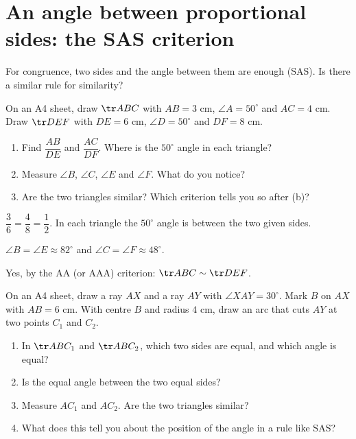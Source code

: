 \section{An angle between proportional sides: the SAS criterion}

For congruence, two sides and the angle between them are enough (SAS). Is there a similar rule for similarity?

\begin{solvefirst}
  \item On an A4 sheet, draw $\tr ABC$ with $AB=3$ cm, $\angle A=50^\circ$ and $AC=4$ cm. Draw $\tr DEF$ with $DE=6$ cm, $\angle D=50^\circ$ and $DF=8$ cm.
  \begin{enumerate}[label=(\alph*),itemsep=1pt]
    \item Find $\dfrac{AB}{DE}$ and $\dfrac{AC}{DF}$. Where is the $50^\circ$ angle in each triangle?
    \item Measure $\angle B$, $\angle C$, $\angle E$ and $\angle F$. What do you notice?
    \item Are the two triangles similar? Which criterion tells you so after (b)?
  \end{enumerate}
\begin{solution}
\begin{steps}
  \item[(a)] $\dfrac36=\dfrac48=\dfrac12$. In each triangle the $50^\circ$ angle is between the two given sides.
  \item[(b)] $\angle B=\angle E\approx82^\circ$ and $\angle C=\angle F\approx48^\circ$.
  \item[(c)] Yes, by the AA (or AAA) criterion: $\tr ABC\sim\tr DEF$.
\end{steps}
\end{solution}
  \item On an A4 sheet, draw a ray $AX$ and a ray $AY$ with $\angle XAY=30^\circ$. Mark $B$ on $AX$ with $AB=6$ cm. With centre $B$ and radius $4$ cm, draw an arc that cuts $AY$ at two points $C_1$ and $C_2$.
  \begin{enumerate}[label=(\alph*),itemsep=1pt]
    \item In $\tr ABC_1$ and $\tr ABC_2$, which two sides are equal, and which angle is equal?
    \item Is the equal angle between the two equal sides?
    \item Measure $AC_1$ and $AC_2$. Are the two triangles similar?
    \item What does this tell you about the position of the angle in a rule like SAS?
  \end{enumerate}


\end{solvefirst}
